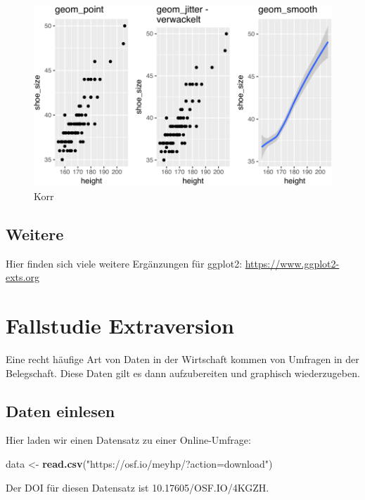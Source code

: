 \documentclass[12pt,]{book}
\newenvironment{Shaded}{\begin{snugshade}}{\end{snugshade}}
\newcommand{\KeywordTok}[1]{\textcolor[rgb]{0.13,0.29,0.53}{\textbf{{#1}}}}
\newcommand{\StringTok}[1]{\textcolor[rgb]{0.31,0.60,0.02}{{#1}}}
\newcommand{\NormalTok}[1]{{#1}}
\begin{document}
\begin{figure}

{\centering \includegraphics[width=0.7\linewidth]{050_Daten_visualisieren_files/figure-latex/unnamed-chunk-34-1} 

}

\caption{Korr}\label{fig:unnamed-chunk-34}
\end{figure}

\subsection{Weitere}\label{weitere}

Hier finden sich viele weitere Ergänzungen für ggplot2:
\url{https://www.ggplot2-exts.org}

\section{Fallstudie Extraversion}\label{fallstudie-extraversion}

Eine recht häufige Art von Daten in der Wirtschaft kommen von Umfragen
in der Belegschaft. Diese Daten gilt es dann aufzubereiten und graphisch
wiederzugeben.

\subsection{Daten einlesen}\label{daten-einlesen}

Hier laden wir einen Datensatz zu einer Online-Umfrage:

\begin{Shaded}
\begin{Highlighting}[]
\NormalTok{data <-}\StringTok{ }\KeywordTok{read.csv}\NormalTok{(}\StringTok{"https://osf.io/meyhp/?action=download"}\NormalTok{)}
\end{Highlighting}
\end{Shaded}

Der DOI für diesen Datensatz ist 10.17605/OSF.IO/4KGZH.
\end{document}
